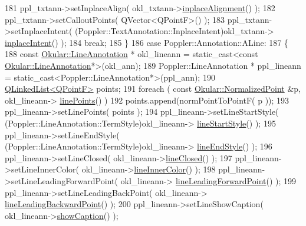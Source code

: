 \begin{DoxyCode}
181             ppl\_txtann->setInplaceAlign( okl\_txtann->\hyperlink{classOkular_1_1TextAnnotation_ada96fce5c424867d6b48a8ae39a8cace}{inplaceAlignment}() );
182             ppl\_txtann->setCalloutPoints( QVector<QPointF>() );
183             ppl\_txtann->setInplaceIntent( (Poppler::TextAnnotation::InplaceIntent)okl\_txtann->
      \hyperlink{classOkular_1_1TextAnnotation_acfa4831c8980e50dc0a47742659a5a63}{inplaceIntent}() );
184             \textcolor{keywordflow}{break};
185         \}
186         \textcolor{keywordflow}{case} Poppler::Annotation::ALine:
187         \{
188             \textcolor{keyword}{const} \hyperlink{classOkular_1_1LineAnnotation}{Okular::LineAnnotation} * okl\_lineann = \textcolor{keyword}{static\_cast<}\textcolor{keyword}{const }
      \hyperlink{classOkular_1_1LineAnnotation}{Okular::LineAnnotation}*\textcolor{keyword}{>}(okl\_ann);
189             Poppler::LineAnnotation * ppl\_lineann = \textcolor{keyword}{static\_cast<}Poppler::LineAnnotation*\textcolor{keyword}{>}(ppl\_ann);
190             \hyperlink{classQLinkedList}{QLinkedList<QPointF>} points;
191             \textcolor{keywordflow}{foreach} ( \textcolor{keyword}{const} \hyperlink{classOkular_1_1NormalizedPoint}{Okular::NormalizedPoint} &p, okl\_lineann->
      \hyperlink{classOkular_1_1LineAnnotation_a93369ba26234da72308372df8e6c3a77}{linePoints}() )
192                 points.append(normPointToPointF( p ));
193             ppl\_lineann->setLinePoints( points );
194             ppl\_lineann->setLineStartStyle( (Poppler::LineAnnotation::TermStyle)okl\_lineann->
      \hyperlink{classOkular_1_1LineAnnotation_add76ac33e76e45cc54ed0ee6d5903a67}{lineStartStyle}() );
195             ppl\_lineann->setLineEndStyle( (Poppler::LineAnnotation::TermStyle)okl\_lineann->
      \hyperlink{classOkular_1_1LineAnnotation_a789669b1ca2c9dcbe1d67eaac7e87ee7}{lineEndStyle}() );
196             ppl\_lineann->setLineClosed( okl\_lineann->\hyperlink{classOkular_1_1LineAnnotation_a5d2d587e08762b48ded428be2e390e79}{lineClosed}() );
197             ppl\_lineann->setLineInnerColor( okl\_lineann->\hyperlink{classOkular_1_1LineAnnotation_a240bcd7154afdf61c526295134abdc0f}{lineInnerColor}() );
198             ppl\_lineann->setLineLeadingForwardPoint( okl\_lineann->
      \hyperlink{classOkular_1_1LineAnnotation_a5ea35b2ee68172d9cf183d8778e34edb}{lineLeadingForwardPoint}() );
199             ppl\_lineann->setLineLeadingBackPoint( okl\_lineann->
      \hyperlink{classOkular_1_1LineAnnotation_a6a492d6aadd6d9ee879f85c5f24e99a0}{lineLeadingBackwardPoint}() );
200             ppl\_lineann->setLineShowCaption( okl\_lineann->\hyperlink{classOkular_1_1LineAnnotation_a29a1ebda3306c7a928c6f94e160cb9de}{showCaption}() );

\end{DoxyCode}
